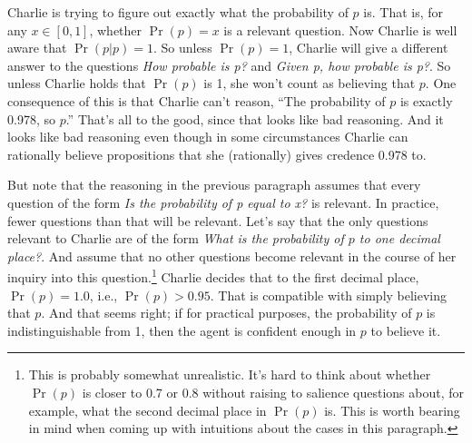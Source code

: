 Charlie is trying to figure out exactly what the probability of \(p\) is. That is, for any \(x \in [0, 1]\), whether \(\Pr(p) = x\) is a relevant question. Now Charlie is well aware that \(\Pr(p | p) = 1\). So unless \(\Pr(p) = 1\), Charlie will give a different answer to the questions \textit{How probable is p?} and \textit{Given p, how probable is p?}. So unless Charlie holds that \(\Pr(p)\) is 1, she won't count as believing that \(p\). One consequence of this is that Charlie can't reason, ``The probability of \(p\) is exactly 0.978, so \(p\).'' That's all to the good, since that looks like bad reasoning. And it looks like bad reasoning even though in some circumstances Charlie can rationally believe propositions that she (rationally) gives credence 0.978 to.

But note that the reasoning in the previous paragraph assumes that every question of the form \textit{Is the probability of p equal to x?} is relevant. In practice, fewer questions than that will be relevant. Let's say that the only questions relevant to Charlie are of the form \textit{What is the probability of \(p\) to one decimal place?}. And assume that no other questions become relevant in the course of her inquiry into this question.\footnote{This is probably somewhat unrealistic. It's hard to think about whether \(\Pr(p)\) is closer to 0.7 or 0.8 without raising to salience questions about, for example, what the second decimal place in \(\Pr(p)\) is. This is worth bearing in mind when coming up with intuitions about the cases in this paragraph.} Charlie decides that to the first decimal place, \(\Pr(p) = 1.0\), i.e., \(\Pr(p) > 0.95\). That is compatible with simply believing that \(p\). And that seems right; if for practical purposes, the probability of \(p\) is indistinguishable from 1, then the agent is confident enough in \(p\) to believe it.